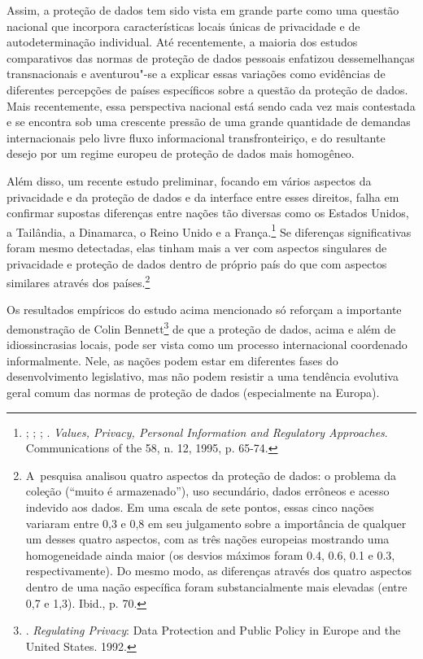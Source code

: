 Assim, a proteção de dados tem sido vista em grande parte como uma
questão nacional que incorpora características locais únicas de
privacidade e de autodeterminação individual. Até recentemente, a
maioria dos estudos comparativos das normas de proteção de dados
pessoais enfatizou dessemelhanças transnacionais e aventurou"-se a
explicar essas variações como evidências de diferentes percepções de
países específicos sobre a questão da proteção de dados. Mais
recentemente, essa perspectiva nacional está sendo cada vez mais
contestada e se encontra sob uma crescente pressão de uma grande
quantidade de demandas internacionais pelo livre fluxo informacional
transfronteiriço, e do resultante desejo por um regime europeu de
proteção de dados mais homogêneo.

Além disso, um recente estudo preliminar, focando em vários aspectos da
privacidade e da proteção de dados e da interface entre esses direitos,
falha em confirmar supostas diferenças entre nações tão diversas como os
Estados Unidos, a Tailândia, a Dinamarca, o Reino Unido e a
França.\footnote{; ;
; . \emph{Values, Privacy,
  Personal Information and Regulatory Approaches}. Communications of the
   58, n. 12, 1995, p. 65-74.} Se diferenças significativas foram
mesmo detectadas, elas tinham mais a ver com aspectos singulares de
privacidade e proteção de dados dentro de próprio país do que com
aspectos similares através dos países.\footnote{A~pesquisa analisou
  quatro aspectos da proteção de dados: o problema da coleção (``muito é
  armazenado''), uso secundário, dados errôneos e acesso indevido aos
  dados. Em uma escala de sete pontos, essas cinco nações variaram entre
  0,3 e 0,8 em seu julgamento sobre a importância de qualquer um desses
  quatro aspectos, com as três nações europeias mostrando uma
  homogeneidade ainda maior (os desvios máximos foram 0.4, 0.6, 0.1 e
  0.3, respectivamente). Do mesmo modo, as diferenças através dos quatro
  aspectos dentro de uma nação específica foram substancialmente mais
  elevadas (entre 0,7 e 1,3). Ibid., p. 70.}

Os resultados empíricos do estudo acima mencionado só reforçam a
importante demonstração de Colin Bennett\footnote{.
  \emph{Regulating Privacy}: Data Protection and Public Policy in Europe
  and the United States. 1992.} de que a proteção de dados, acima e além
de idiossincrasias locais, pode ser vista como um processo internacional
coordenado informalmente. Nele, as nações podem estar em diferentes
fases do desenvolvimento legislativo, mas não podem resistir a uma
tendência evolutiva geral comum das normas de proteção de dados
(especialmente na Europa).

